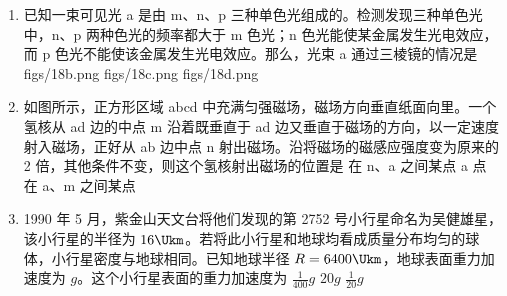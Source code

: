 \documentclass[\gkver]{gaokaozhenti}
\begin{document}
\begin{enumerate}
\item
已知一束可见光 a 是由 m、n、p 三种单色光组成的。检测发现三种单色光中，n、p 两种色光的频率都大于 m 色光；n 色光能使某金属发生光电效应，而 p 色光不能使该金属发生光电效应。那么，光束 a 通过三棱镜的情况是
{figs/18b.png}
{figs/18c.png}
{figs/18d.png}

\item
如图所示，正方形区域 abcd 中充满匀强磁场，磁场方向垂直纸面向里。一个氢核从 ad 边的中点 m 沿着既垂直于 ad 边又垂直于磁场的方向，以一定速度射入磁场，正好从 ab 边中点 n 射出磁场。沿将磁场的磁感应强度变为原来的 2 倍，其他条件不变，则这个氢核射出磁场的位置是
{在 n、a 之间某点}
{a 点}
{在 a、m 之间某点}

\item
1990 年 5 月，紫金山天文台将他们发现的第 2752 号小行星命名为吴健雄星，该小行星的半径为 $16\Ukm$。若将此小行星和地球均看成质量分布均匀的球体，小行星密度与地球相同。已知地球半径 $R=6400\Ukm$，地球表面重力加速度为 $g$。这个小行星表面的重力加速度为
{$\frac{1}{400}g$}
{$20g$}
{$\frac{1}{20}g$}


\end{enumerate}
\end{document}

